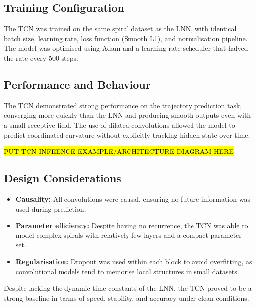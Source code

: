\subsection{Training Configuration}
The TCN was trained on the same spiral dataset as the LNN, with identical batch size, learning rate, loss function (Smooth L1), and normalisation pipeline. The model was optimised using Adam and a learning rate scheduler that halved the rate every 500 steps.

\subsection{Performance and Behaviour}
The TCN demonstrated strong performance on the trajectory prediction task, converging more quickly than the LNN and producing smooth outputs even with a small receptive field. The use of dilated convolutions allowed the model to predict coordinated curvature without explicitly tracking hidden state over time.

\hl{PUT TCN INFEENCE EXAMPLE/ARCHITECTURE DIAGRAM HERE}


\subsection{Design Considerations}
\begin{itemize}
    \item \textbf{Causality:} All convolutions were causal, ensuring no future information was used during prediction.
    \item \textbf{Parameter efficiency:} Despite having no recurrence, the TCN was able to model complex spirals with relatively few layers and a compact parameter set.
    \item \textbf{Regularisation:} Dropout was used within each block to avoid overfitting, as convolutional models tend to memorise local structures in small datasets.
\end{itemize}

Despite lacking the dynamic time constants of the LNN, the TCN proved to be a strong baseline in terms of speed, stability, and accuracy under clean conditions.


